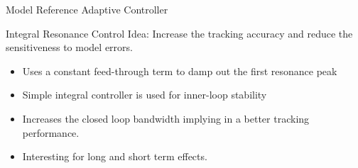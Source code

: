 \documentclass[10pt]{beamer}
\begin{document}
\begin{frame}{Model Reference Adaptive Controller}
  \begin{figure}[h!]
    \centering %
    \qquad
  \end{figure}
\end{frame}

\begin{frame}{Integral Resonance Control}
  \alert{Idea}: Increase the tracking accuracy and reduce the sensitiveness to model errors.
  \begin{itemize}
    \item Uses a constant feed-through term to damp out the first resonance peak
    \item Simple integral controller is used for inner-loop stability
    \item Increases the closed loop bandwidth implying in a better tracking performance.
    \item Interesting for long and short term effects.
  \end{itemize}
\end{frame}
\end{document}
